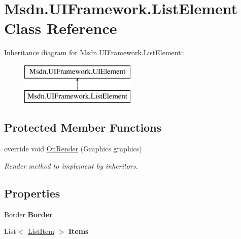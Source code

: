 \hypertarget{class_msdn_1_1_u_i_framework_1_1_list_element}{
\section{Msdn.UIFramework.ListElement Class Reference}
\label{class_msdn_1_1_u_i_framework_1_1_list_element}
}
Inheritance diagram for Msdn.UIFramework.ListElement::\begin{figure}[H]
\begin{center}
\leavevmode
\includegraphics[height=2cm]{class_msdn_1_1_u_i_framework_1_1_list_element}
\end{center}
\end{figure}
\subsection*{Protected Member Functions}
\begin{DoxyCompactItemize}
\item 
override void \hyperlink{class_msdn_1_1_u_i_framework_1_1_list_element_ac0b1519bbc015086de494e64b0238b5e}{OnRender} (Graphics graphics)
\begin{DoxyCompactList}\small\item\em Render method to implement by inheritors. \item\end{DoxyCompactList}\end{DoxyCompactItemize}
\subsection*{Properties}
\begin{DoxyCompactItemize}
\item 
\hypertarget{class_msdn_1_1_u_i_framework_1_1_list_element_ab35dc377d14ae5f8b30eb13567af8d71}{
\hyperlink{class_msdn_1_1_u_i_framework_1_1_border}{Border} {\bfseries Border}}
\label{class_msdn_1_1_u_i_framework_1_1_list_element_ab35dc377d14ae5f8b30eb13567af8d71}

\item 
\hypertarget{class_msdn_1_1_u_i_framework_1_1_list_element_a038c1eed49c8f7dd2fee9c54f14a84d7}{
List$<$ \hyperlink{class_msdn_1_1_u_i_framework_1_1_list_item}{ListItem} $>$ {\bfseries Items}}
\label{class_msdn_1_1_u_i_framework_1_1_list_element_a038c1eed49c8f7dd2fee9c54f14a84d7}

\end{DoxyCompactItemize}


